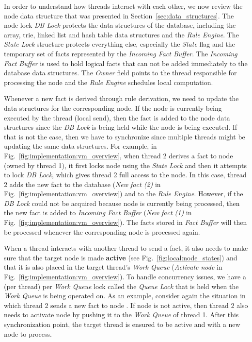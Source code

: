 In order to understand how threads interact with each other, we now review the
node data structure that was presented in Section~\ref{sec:data_structures}.
The node lock \emph{DB Lock} protects the data structures of the database,
including the array, trie, linked list and hash table data structures and the
\emph{Rule Engine}. The \emph{State Lock} structure protects everything else,
especially the \emph{State} flag and the temporary set of facts represented by
the \emph{Incoming Fact Buffer}. The \emph{Incoming Fact Buffer} is used to hold
logical facts that can not be added immediately to the database data structures.
The \emph{Owner} field points to the thread responsible for processing the node
and the \emph{Rule Engine} schedules local computation.

Whenever a new fact is derived through rule derivation, we need to update the
data structures for the corresponding node. If the node is currently being
executed by the thread (local send), then the fact is added to the node data
structures since the \emph{DB Lock} is being held while the node is being
executed. If that is not the case, then we have to synchronize since multiple
threads might be updating the same data structures. For example, in
Fig.~\ref{fig:implementation:vm_overview}, when thread 2 derives a fact to node
 (owned by thread 1), it first locks node  using the
\emph{State Lock} and then it attempts to lock \emph{DB Lock}, which gives thread
2 full access to the node. In this case, thread 2 adds the new fact to the
database (\emph{New fact (2)} in Fig.~\ref{fig:implementation:vm_overview}) and
to the \emph{Rule Engine}. However, if the \emph{DB Lock} could not be acquired
because node  is currently being processed, then the new fact is
added to \emph{Incoming Fact Buffer} (\emph{New fact (1)} in
Fig.~\ref{fig:implementation:vm_overview}). The facts stored in \emph{Fact
Buffer} will then be processed whenever the corresponding node is processed
again.

When a thread interacts with another thread to send a fact, it also needs to
make sure that the target node is made \textbf{active} (see
Fig.~\ref{fig:local:node_states}) and that it is also placed in the target
thread's \emph{Work Queue} (\emph{Activate node} in
Fig.~\ref{fig:implementation:vm_overview}). To handle concurrency issues, we
have a (per thread) per \emph{Work Queue} lock called the \emph{Queue Lock} that
is held when the \emph{Work Queue} is being operated on.  As an example,
consider again the situation in which thread 2 sends a new fact to node
. If node  is not active, then thread 2 also needs to activate
node  by pushing it to the \emph{Work Queue} of thread 1.  After this
synchronization point, the target thread is ensured to be active and with a new
node to process.

